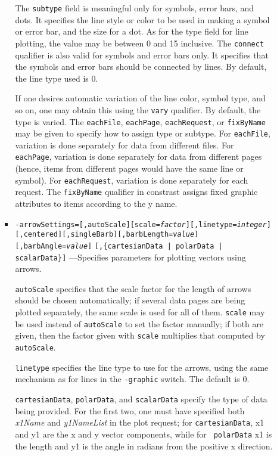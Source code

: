 \begin{itemize}
\begin{itemize}
\begin{itemize}
The {\tt subtype} field is meaningful only for symbols, error bars, and dots.  It specifies the line style
or color to be used in making a symbol or error bar, and the size for a dot.  As for the type field for
line plotting, the value may be between 0 and 15 inclusive.  The {\tt connect} qualifier is also valid for
symbols and error bars only.  It specifies that the symbols and error bars should be connected by lines.
By default, the line type used is 0.

If one desires automatic variation of the line color, symbol type, and
so on, one may obtain this using the \verb|vary| qualifier.  By
default, the type is varied.  The \verb|eachFile|, \verb|eachPage|,
\verb|eachRequest|, or \verb|fixByName| may be given to specify how to
assign type or subtype.  For \verb|eachFile|, variation is done
separately for data from different files.  For \verb|eachPage|,
variation is done separately for data from different pages (hence,
items from different pages would have the same line or symbol).  For
\verb|eachRequest|, variation is done separately for each request.
The \verb|fixByName| qualifier in constrast assigns fixed graphic
attributes to items according to the y name.

  \item {\tt -arrowSettings=[,autoScale][scale={\em factor}][,linetype={\em integer}]}
{\tt [,centered][,singleBarb][,barbLength={\em value}][,barbAngle={\em value}]}
{\tt [,\{cartesianData | polarData | scalarData\}]}
---Specifies parameters for plotting vectors using arrows.

{\tt autoScale} specifies that the scale factor for the length of arrows should be chosen
automatically; if several data pages are being plotted separately, the same scale is used for all of
them.  {\tt scale} may be used instead of {\tt autoScale} to set the factor manually; if both are
given, then the factor given with {\tt scale} multiplies that computed by {\tt autoScale}.

{\tt linetype} specifies the line type to use for the arrows, using the same mechanism as for lines
in the {\tt -graphic} switch.  The default is 0.

{\tt cartesianData}, {\tt polarData}, and {\tt scalarData} specify the type of data being provided.
For the first two, one must have specified both {\em x1Name} and {\em y1NameList} in the plot
request; for {\tt cartesianData}, x1 and y1 are the x and y vector components, while for {\tt
polarData} x1 is the length and y1 is the angle in radians from the positive x direction.


\end{itemize}
\end{itemize}
\end{itemize}
